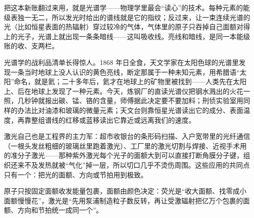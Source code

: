 \begin{mainline}
把这本新账翻过来用，就是光谱学——物理学里最会“读心”的技术。每种元素的能级表独一无二，所以发光时给出的谱线就是它的指纹；反过来，让一束连续光谱的光（比如恒星表面的热辐射）穿过较冷的气体，气体里的原子只吞掉自己面额对得上的光子，光谱上就出现一条条暗线——这叫吸收线。亮线和暗线，是同一本能级账的收、支两栏。

光谱学的战利品清单长得惊人。1868 年日全食，天文学家在太阳色球的光谱里发现一条当时地球上没人认识的黄色亮线，断定那属于一种未知元素，用希腊语“太阳”命名，就是氦；二十多年后，氦才在地球上的矿物里被找到——人类先在太阳上、后在地球上发现了一种元素。今天，炼钢厂的直读光谱仪把钢水溅出的火花一照，几秒钟就报出碳、锰、铬的含量，师傅据此决定要不要加料；刑侦实验室用同样的办法比对油漆和玻璃的微量元素；天文台则靠恒星光谱读出它的成分、表面温度，再靠整组谱线的红移或蓝移读出它靠近或远离我们的速度。

激光自己也是工程界的主力军：超市收银台的条形码扫描、入户宽带里的光纤通信（一根头发丝粗细的玻璃丝里跑着激光）、工厂里的激光切割与焊接、近视手术用的准分子激光——那种紫外激光每个光子的面额大到可以直接打断角膜分子键，组织还来不及发热就被“气化”掉一层，所以切口几乎不烫伤周围。这些应用的共同点只有一个：把光的面额、方向或节拍用到极致。
\end{mainline}


\begin{oneline}
原子只按固定面额收发能量包裹，面额由颜色决定：荧光是“收大面额、找零成小面额慢慢花”，激光是“先用泵浦制造粒子数反转，再让受激辐射把亿万个包裹的面额、方向和节拍统一成同一个”。
\end{oneline}



